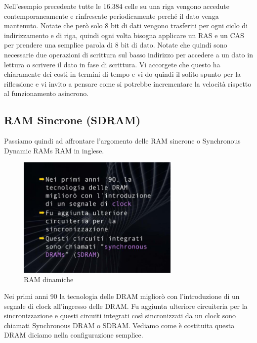 Nell'esempio precedente tutte le 16.384 celle su una riga vengono accedute contemporaneamente e rinfrescate periodicamente perché il dato venga mantenuto.
Notate che però solo 8 bit di dati vengono trasferiti per ogni ciclo di indirizzamento e di riga, quindi ogni volta bisogna applicare un RAS e un CAS per prendere una semplice parola di 8 bit di dato.
Notate che quindi sono necessarie due operazioni di scrittura sul basso indirizzo per accedere a un dato in lettura o scrivere il dato in fase di scrittura.
Vi accorgete che questo ha chiaramente dei costi in termini di tempo e vi do quindi il solito spunto per la riflessione e vi invito a pensare come si potrebbe incrementare la velocità rispetto al funzionamento asincrono.

\subsection{RAM Sincrone (SDRAM)}

Passiamo quindi ad affrontare l'argomento delle RAM sincrone o Synchronous Dynamic RAMs RAM in inglese.

\FloatBarrier
\begin{figure}[H]
  \centering
  \includegraphics[width=0.70\textwidth,
                    trim=40 30 20 40, %
                    clip]
                    {images/Lez04_p05_fig_05.png}
  \caption{RAM dinamiche}
  \label{fig:Lez04_p05_fig_05}
\end{figure}
\FloatBarrier
\noindent

Nei primi anni 90 la tecnologia delle DRAM migliorò con l'introduzione di un segnale di clock all'ingresso delle DRAM.
Fu aggiunta ulteriore circuiteria per la sincronizzazione e questi circuiti integrati così sincronizzati da un clock sono chiamati Synchronous DRAM o SDRAM.
Vediamo come è costituita questa DRAM diciamo nella configurazione semplice.

